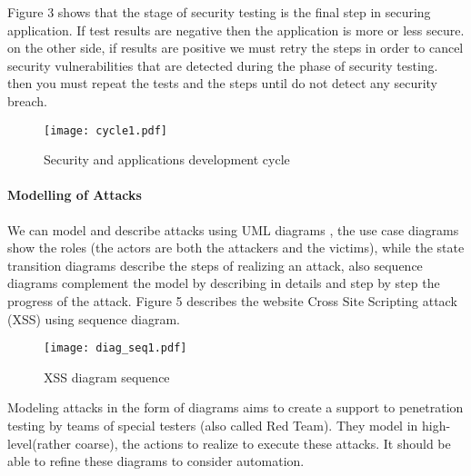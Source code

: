 \documentclass{acm_proc_article-sp}
\begin{document}
Figure 3 shows that the stage of security testing is the final step in securing application. If test results are negative then the application is more or less secure. on the other side, if results are positive we must retry the steps in order to cancel security vulnerabilities that are detected during the phase of security testing. then you must repeat the tests and the steps until do not detect any security breach.
\begin{figure}[h!]                                                       \centering                                                               \texttt{[image: cycle1.pdf]}              \caption{Security and applications development cycle}                    \label{Security and applications development cycle}                      \end{figure}                                                             

\paragraph{Modelling of Attacks}
We can model and describe attacks using UML diagrams \cite{Ray:2005:TAA:1079837.1079984, Hope:2004:MAC:1009229.1009292}, the use case diagrams show the roles (the actors are both the attackers and the victims), while the state transition diagrams describe the steps of realizing an attack, also sequence diagrams complement the model by describing in details and step by step the progress of the attack. Figure 5 describes the website Cross Site Scripting attack (XSS) using sequence diagram.\\
\begin{figure}[h!]                                                       \centering                                                               \texttt{[image: diag\_seq1.pdf]}           \caption{XSS diagram sequence}                                           \label{XSS diagram sequence}                                             \end{figure}                                                             Modeling attacks in the form of diagrams aims to create a support to penetration testing by teams of special testers (also called Red Team). They model in high-level(rather coarse), the actions to realize to execute these attacks. It should be able to refine these diagrams to consider automation.
\end{document}
